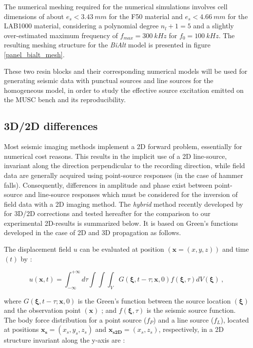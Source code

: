\documentclass[manuscript,revised]{geophysics}
\newcommand{\bialt}{\textit{BiAlt} }
\begin{document}
\noindent The numerical meshing required for the numerical simulations involves cell dimensions of about $e_{s}<3.43\ mm$ for the F50 material and $e_{s}<4.66\ mm$ for the LAB1000 material, considering a polynomial degree $n_{l}+1=5$ and a slightly over-estimated maximum frequency of $f_{max}=300\ kHz$ for $f_{0}=100\ kHz$. The resulting meshing structure for the \bialt model is presented in figure \ref{panel_bialt_mesh}.

\noindent These two resin blocks and their corresponding numerical models will be used for generating seismic data with punctual sources and line sources for the homogeneous model, in order to study the effective source excitation emitted on the MUSC bench and its reproducibility.

\subsection{3D/2D differences}

\noindent Most seismic imaging methods implement a 2D forward problem, essentially for numerical cost reasons. This results in the implicit use of a 2D line-source, invariant along the direction perpendicular to the recording direction, while field data are generally acquired using point-source responses (in the case of hammer falls). Consequently, differences in amplitude and phase exist between point-source and line-source responses which must be considered for the inversion of field data with a 2D imaging method. The \textit{hybrid} method recently developed by \citet{Forbriger_LSS_2014} for 3D/2D corrections and tested hereafter for the comparison to our experimental 2D-results is summarized below. It is based on Green's functions developed in the case of 2D and 3D propagation as follows.

\noindent The displacement field $u$ can be evaluated at position $(\mathbf{x}=(x,y,z))$ and time $(t)$ by \citep{aki2002quantitative}:

\begin{equation}
u(\mathbf{x},t) = \int_{-\infty}^{+\infty}d\tau \int \int \int_{V} G(\mathbf{\xi},t-\tau;\mathbf{x},0)f(\mathbf{\xi},\tau)dV(\mathbf{\xi})\ ,
\label{eq:displacement}
\end{equation}

\noindent where $G(\mathbf{\xi},t-\tau;\mathbf{x},0)$ is the Green's function between the source location $(\mathbf{\xi})$ and the observation point $(\mathbf{x})$ ; and $f(\mathbf{\xi},\tau)$ is the seismic source function. The body force distribution for a point source ($f_{P}$) and a line source ($f_{L}$), located at positions $ \mathbf{x_{s}}=(x_{s}, y_{s},z_{s}) $ and $ \mathbf{x_{s2D}}=(x_{s},z_{s}) $, respectively, in a 2D structure invariant along the y-axis are :
\end{document}
